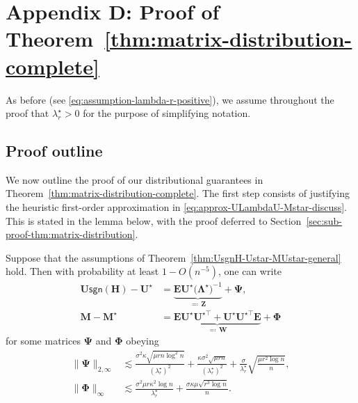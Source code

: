 \section{Appendix D: Proof of Theorem~\ref{thm:matrix-distribution-complete}}
\label{sec:proof-thm:matrix-distribution-complete}




As before (see \eqref{eq:assumption-lambda-r-positive}), we assume throughout the proof that $\lambda_r^{\star}>0$ for the purpose of simplifying notation. 




\subsection{Proof outline}


We now outline the proof of our distributional guarantees in Theorem~\ref{thm:matrix-distribution-complete}. 
The first step consists of justifying the heuristic first-order approximation in \eqref{eq:approx-ULambdaU-Mstar-discuss}. This is stated in the lemma below, with the proof deferred to Section~\ref{sec:sub-proof-thm:matrix-distribution}. 
%
\begin{lemma}
\label{thm:matrix-distribution}
%
Suppose that the assumptions of Theorem~\ref{thm:UsgnH-Ustar-MUstar-general} hold. Then with probability at least $1-O(n^{-5})$, one can write
%
\begin{subequations}
\label{eq:U-M-decomposition-thm}
\begin{align}
\bm{U}\mathsf{sgn}(\bm{H})-\bm{U}^{\star} & =\underset{\eqqcolon\,\bm{Z}}{\underbrace{\bm{E}\bm{U}^{\star}\big(\bm{\Lambda}^{\star}\big)^{-1}}}+\bm{\Psi},
	\label{eq:U-Ustar-decomposition-Z-Psi-thm}\\
\bm{M}-\bm{M}^{\star} & =\underset{\eqqcolon\,\bm{W}}{\underbrace{\bm{E}\bm{U}^{\star}\bm{U}^{\star\top}+\bm{U}^{\star}\bm{U}^{\star\top}\bm{E}}}+\bm{\Phi}
	\label{eq:M-Mstar-diff-decomposition-thm}
\end{align}
\end{subequations}
%
for some matrices $\bm{\Psi}$ and $\bm{\Phi}$ obeying
%
\begin{subequations}
\label{eq:Psi-Phi-bound-thm}
\begin{align}
\|\bm{\Psi}\|_{2,\infty} & \lesssim\frac{\sigma^{2}\kappa\sqrt{\mu rn\log^{2}n}}{(\lambda_{r}^{\star})^{2}}+\frac{\kappa\sigma^{2}\sqrt{\mu rn}}{(\lambda_{r}^{\star})^{2}}+\frac{\sigma}{\lambda_{r}^{\star}}\sqrt{\frac{\mu r^{2}\log n}{n}},\\
\big\|\bm{\Phi}\big\|_{\infty} & \lesssim\frac{\sigma^{2}\mu r\kappa^{2}\log n}{\lambda_{r}^{\star}}+\frac{\sigma\kappa\mu\sqrt{r^{3}\log n}}{n}.
\end{align}
\end{subequations}
%
\end{lemma}
